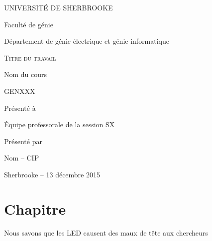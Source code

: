 \documentclass[letterpaper,11pt]{report}
\begin{document}
\begin{titlepage}
  \setlength{\parskip}{0em}
  
  \centering \par
  \uppercase{Université de Sherbrooke}\par
  Faculté de génie\par
  Département de génie électrique et génie informatique
  
  \vspace{3cm}
  {\scshape\LARGE\centering Titre du travail \par}
  \vspace{3cm}
  Nom du cours\par
  GENXXX
  \vspace{3cm}

  {\centering Présenté à \par}
  Équipe professorale de la session SX
  \vspace{4cm}
  
  {\centering Présenté par \par}
  {\centering Nom -- CIP \par}
  

  \vfill
  {\centering Sherbrooke -- 13 décembre 2015}

\end{titlepage}

\setcounter{page}{1}

\tableofcontents
\setlength{\parskip}{1em}

\newpage

\setcounter{page}{1}

\chapter{Chapitre}
Nous savons que les LED causent des maux de tête aux chercheurs \cite{FuturaDEL2}



\end{document}
